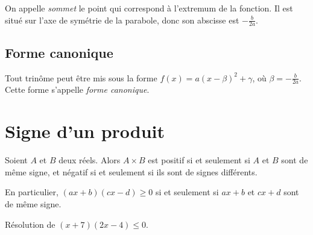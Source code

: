 \begin{definition}
  On appelle \emph{sommet} le point qui correspond à l'extremum de la fonction. Il est situé sur l'axe de symétrie de la parabole, donc son abscisse est $-\frac{b}{2a}$.
\end{definition}

\subsection{Forme canonique}

\begin{propriete}
  Tout trinôme peut être mis sous la forme $f(x)=a(x-\beta)^2+\gamma$, où $\beta=-\frac{b}{2a}$. Cette forme s'appelle \emph{forme canonique}.
\end{propriete}

\section{Signe d'un produit}

\begin{propriete}
  Soient $A$ et $B$ deux réels. Alors $A\times B$ est positif si et seulement si $A$ et $B$ sont de même signe, et négatif si et seulement si ils sont de signes différents.

  En particulier, $(ax+b)(cx-d)\geq0$ si et seulement si $ax+b$ et $cx+d$ sont de même signe.
\end{propriete}

\begin{exemple}
  Résolution de $(x+7)(2x-4)\leq0$.
\end{exemple}

